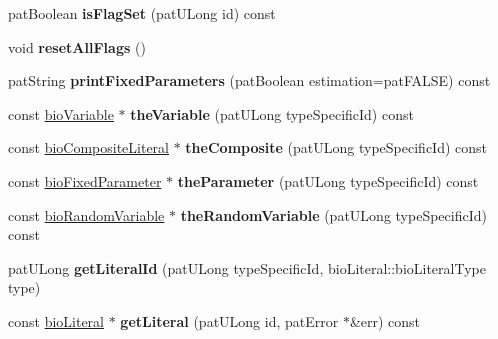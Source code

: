 \begin{DoxyCompactItemize}
pat\+Boolean {\bfseries is\+Flag\+Set} (pat\+U\+Long id) const
\item 
\mbox{\label{classbio_literal_repository_ae22576cfb2dc530b1851f4444fd93123}} 
void {\bfseries reset\+All\+Flags} ()
\item 
\mbox{\label{classbio_literal_repository_a7e03c8b3d31bdbc2bcc4543d13bf6926}} 
pat\+String {\bfseries print\+Fixed\+Parameters} (pat\+Boolean estimation=pat\+F\+A\+L\+SE) const
\item 
\mbox{\label{classbio_literal_repository_a01be32eb76014329d373356dc6d9b47e}} 
const \hyperlink{classbio_variable}{bio\+Variable} $\ast$ {\bfseries the\+Variable} (pat\+U\+Long type\+Specific\+Id) const
\item 
\mbox{\label{classbio_literal_repository_a645140bcaa2fc6c0156205dfaa4c8c7f}} 
const \hyperlink{classbio_composite_literal}{bio\+Composite\+Literal} $\ast$ {\bfseries the\+Composite} (pat\+U\+Long type\+Specific\+Id) const
\item 
\mbox{\label{classbio_literal_repository_a1c13cfeb0707eb2d1edd7f22ef957e71}} 
const \hyperlink{classbio_fixed_parameter}{bio\+Fixed\+Parameter} $\ast$ {\bfseries the\+Parameter} (pat\+U\+Long type\+Specific\+Id) const
\item 
\mbox{\label{classbio_literal_repository_a6a1f0341bd49a1065c0eda80b994c9a8}} 
const \hyperlink{classbio_random_variable}{bio\+Random\+Variable} $\ast$ {\bfseries the\+Random\+Variable} (pat\+U\+Long type\+Specific\+Id) const
\item 
\mbox{\label{classbio_literal_repository_a35cc4a77ea12f27f88235a4b795263a2}} 
pat\+U\+Long {\bfseries get\+Literal\+Id} (pat\+U\+Long type\+Specific\+Id, bio\+Literal\+::bio\+Literal\+Type type)
\item 
\mbox{\label{classbio_literal_repository_a350ecc4f3ef6cdb6b77b266b7ba3c2b2}} 
const \hyperlink{classbio_literal}{bio\+Literal} $\ast$ {\bfseries get\+Literal} (pat\+U\+Long id, pat\+Error $\ast$\&err) const

\end{DoxyCompactItemize}

